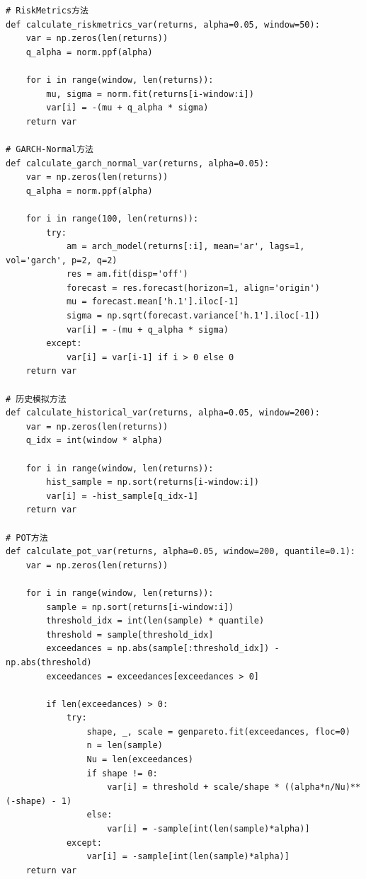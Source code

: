 \documentclass[12pt, a4paper]{article}
\begin{document}
\begin{lstlisting}[basicstyle=\small\ttfamily, breaklines=true, columns=fullflexible]
# RiskMetrics方法
def calculate_riskmetrics_var(returns, alpha=0.05, window=50):
    var = np.zeros(len(returns))
    q_alpha = norm.ppf(alpha)
    
    for i in range(window, len(returns)):
        mu, sigma = norm.fit(returns[i-window:i])
        var[i] = -(mu + q_alpha * sigma)
    return var

# GARCH-Normal方法
def calculate_garch_normal_var(returns, alpha=0.05):
    var = np.zeros(len(returns))
    q_alpha = norm.ppf(alpha)
    
    for i in range(100, len(returns)):
        try:
            am = arch_model(returns[:i], mean='ar', lags=1, vol='garch', p=2, q=2)
            res = am.fit(disp='off')
            forecast = res.forecast(horizon=1, align='origin')
            mu = forecast.mean['h.1'].iloc[-1]
            sigma = np.sqrt(forecast.variance['h.1'].iloc[-1])
            var[i] = -(mu + q_alpha * sigma)
        except:
            var[i] = var[i-1] if i > 0 else 0
    return var

# 历史模拟方法
def calculate_historical_var(returns, alpha=0.05, window=200):
    var = np.zeros(len(returns))
    q_idx = int(window * alpha)
    
    for i in range(window, len(returns)):
        hist_sample = np.sort(returns[i-window:i])
        var[i] = -hist_sample[q_idx-1]
    return var

# POT方法
def calculate_pot_var(returns, alpha=0.05, window=200, quantile=0.1):
    var = np.zeros(len(returns))
    
    for i in range(window, len(returns)):
        sample = np.sort(returns[i-window:i])
        threshold_idx = int(len(sample) * quantile)
        threshold = sample[threshold_idx]
        exceedances = np.abs(sample[:threshold_idx]) - np.abs(threshold)
        exceedances = exceedances[exceedances > 0]
        
        if len(exceedances) > 0:
            try:
                shape, _, scale = genpareto.fit(exceedances, floc=0)
                n = len(sample)
                Nu = len(exceedances)
                if shape != 0:
                    var[i] = threshold + scale/shape * ((alpha*n/Nu)**(-shape) - 1)
                else:
                    var[i] = -sample[int(len(sample)*alpha)]
            except:
                var[i] = -sample[int(len(sample)*alpha)]
    return var


\end{lstlisting}
\end{document}
